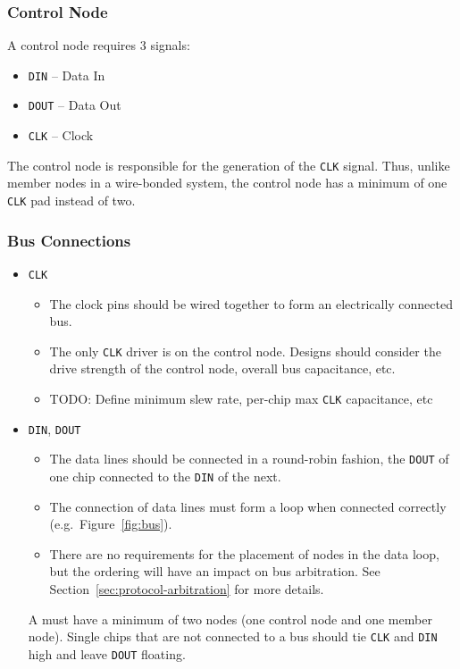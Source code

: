 \subsubsection{Control Node}
\label{sec:physical-control}
A control node requires 3 signals:

\begin{itemize}
  \item {\tt DIN} -- Data In
  \item {\tt DOUT} -- Data Out
  \item {\tt CLK} -- Clock
\end{itemize}

The control node is responsible for the generation of the {\tt CLK} signal.
Thus, unlike member nodes in a wire-bonded system, the control node has a
minimum of one {\tt CLK} pad instead of two.

\subsubsection{Bus Connections}
\label{sec:physical-bus}
\begin{itemize}
  \item {\tt CLK}
  \begin{itemize}
    \item The clock pins should be wired together to form an electrically
      connected bus.
    \item The only {\tt CLK} driver is on the control node. Designs should
      consider the drive strength of the control node, overall bus
      capacitance, etc.
    \item TODO: Define minimum slew rate, per-chip max {\tt CLK} capacitance,
      etc
  \end{itemize}
  \item {\tt DIN}, {\tt DOUT}
  \begin{itemize}
    \item The data lines should be connected in a round-robin fashion, the
      {\tt DOUT} of one chip connected to the {\tt DIN} of the next.
    \item The connection of data lines must form a loop when connected
      correctly (e.g.~Figure~\ref{fig:bus}).
    \item There are no requirements for the placement of nodes in the data
      loop, but the ordering will have an impact on bus arbitration. See
      Section~\ref{sec:protocol-arbitration} for more details.
  \end{itemize}
  A \bus must have a minimum of two nodes (one control node and one
  member node). Single chips that are not connected to a bus should tie
  {\tt CLK} and {\tt DIN} high and leave {\tt DOUT} floating.
\end{itemize}


